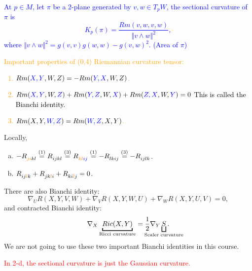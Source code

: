 \textcolor{blue}{
    \begin{definition}
        At \(p\in M\), let \(\pi\) be a 2-plane generated by \(v,w\in T_p W\),
    the sectional curvature of \(\pi\) is 
    \[
        K_p(\pi)=\frac{Rm(v,w,v,w)}{\Vert v\wedge w\Vert^2},    
    \]
    where \(\Vert v\wedge w\Vert^2=g(v,v)g(w,w)-g(v,w)^2\). (Area of 
    \(\pi\))
    \end{definition}
}

\textcolor{orange}{
    Important properties of (0,4) Riemannian curvature tensor: 
    \begin{enumerate}[(1)]
        \item \(Rm(\textcolor{blue}{X,Y},W,Z)=
        -Rm(\textcolor{blue}{Y,X},W,Z)\).
        \item \(
            Rm(\textcolor{blue}{X,Y},W,\textcolor{blue}{Z})
            +Rm(\textcolor{blue}{Y,Z},W,\textcolor{blue}{X})
            +Rm(\textcolor{blue}{Z,X},W,\textcolor{blue}{Y})
            =0
        \)
        \textcolor{black}{This is called the  
        Bianchi identity.}
        \item \(Rm(X,Y,\textcolor{blue}{W,Z})=Rm(\textcolor{blue}{W,Z}
        ,X,Y)\).
    \end{enumerate}
}
Locally, 
\begin{enumerate}[(a)]
    \item \(
    -\tensor{R}{_{\textcolor{orange}{ji}kl}}
    \overset{(1)}{=}
    \tensor{R}{_{ijkl}}
    \overset{(3)}{=}
    \tensor{R}{_{\textcolor{orange}{kl}\textcolor{blue}{ij}}}
    \overset{(1)}{=}
    -\tensor{R}{_{lkij}}
    \overset{(3)}{=}
    -\tensor{R}{_{ijlk}}
    \).
    \item \(
        \tensor{R}{_{ij\textcolor{orange}{l}k}}
        +\tensor{R}{_{jk\textcolor{orange}{l}i}}
        +\tensor{R}{_{ki\textcolor{orange}{l}j}}=0
    \).
\end{enumerate}
\begin{remark}
    There are also  Bianchi identity:
    \[
        \nabla_U R(X,Y,V,W)
        +\nabla_V R(X,Y,W,U)
        +\nabla_W R(X,Y,U,V)=0,    
    \]
    and contracted  Bianchi identity:
    \[
        \nabla_X \underbracket{Ric(X,Y)}_{\text{Ricci curvature}}
        =\frac{1}{2}\nabla_Y \underbracket[1pt][7pt]{S}_{\mathclap{
            \text{Scaler curvature}}}.
    \]
    We are not going to use these two important Bianchi identities
    in this course.
\end{remark}
\begin{theorem}
    \textcolor{red}{In 2-d, the sectional curvature is just the
    Gaussian curvature.}
\end{theorem}
